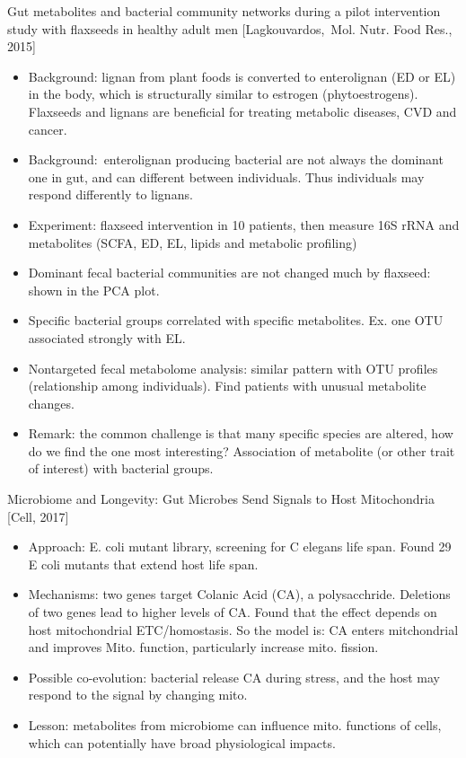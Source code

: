 \documentclass{report}
\begin{document}
Gut metabolites and bacterial community networks during a pilot intervention study with ﬂaxseeds in healthy adult men [Lagkouvardos, Mol. Nutr. Food Res., 2015]
\begin{itemize}
	\item Background: lignan from plant foods is converted to enterolignan (ED or EL) in the body, which is structurally similar to estrogen (phytoestrogens). Flaxseeds and lignans are beneficial for treating metabolic diseases, CVD and cancer.
	
	\item Background: enterolignan producing bacterial are not always the dominant one in gut, and can different between individuals. Thus individuals may respond differently to lignans.
	
	\item Experiment: flaxseed intervention in 10 patients, then measure 16S rRNA and metabolites (SCFA, ED, EL, lipids and metabolic profiling)
	
	\item Dominant fecal bacterial communities are not changed much by flaxseed: shown in the PCA plot.
	
	\item Specific bacterial groups correlated with specific metabolites. Ex. one OTU associated strongly with EL.
	
	\item Nontargeted fecal metabolome analysis: similar pattern with OTU profiles (relationship among individuals). Find patients with unusual metabolite changes.
	
	\item Remark: the common challenge is that many specific species are altered, how do we find the one most interesting? Association of metabolite (or other trait of interest) with bacterial groups.
\end{itemize}

Microbiome and Longevity: Gut Microbes Send Signals to Host Mitochondria [Cell, 2017]
\begin{itemize}
	\item Approach: E. coli mutant library, screening for C elegans life span. Found 29 E coli mutants that extend host life span.
	
	\item Mechanisms: two genes target Colanic Acid (CA), a polysacchride. Deletions of two genes lead to higher levels of CA. Found that the effect depends on host mitochondrial ETC/homostasis. So the model is: CA enters mitchondrial and improves Mito. function, particularly increase mito. fission.
	
	\item Possible co-evolution: bacterial release CA during stress, and the host may respond to the signal by changing mito.
	
	\item Lesson: metabolites from microbiome can influence mito. functions of cells, which can potentially have broad physiological impacts.
\end{itemize}
\end{document}
